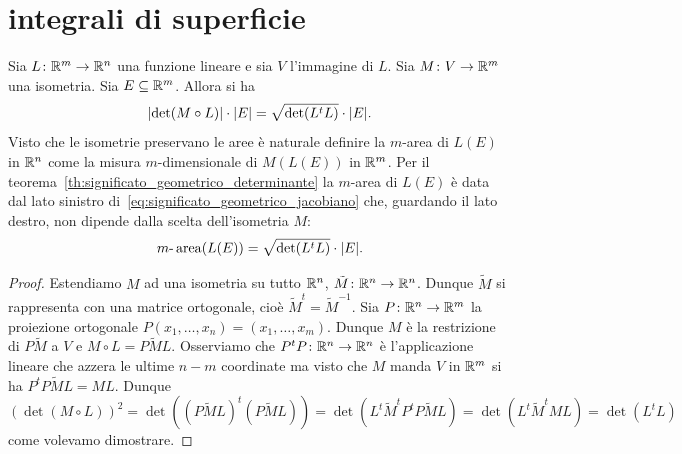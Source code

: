 \section{integrali di superficie}

\begin{theorem}
  \label{th:significato_geometrico_jacobiano}
  Sia $L\colon {\mathbb R}^m \to {\mathbb R}^n$ una funzione lineare
  e sia $V$ l'immagine di $L$.
  Sia $M\colon V \to {\mathbb R}^m$ una isometria.
  Sia $E\subseteq {\mathbb R}^m$.
  Allora si ha 
  \begin{equation}\label{eq:significato_geometrico_jacobiano}
    {\left|\det (M\circ L)\right|}\cdot {\left|E\right|} = \sqrt{\det (L^t L)}\cdot {\left|E\right|}.
  \end{equation}
  Visto che le isometrie preservano le aree
  è naturale definire la $m$-area di $L(E)$ in ${\mathbb R}^n$ 
  come la misura $m$-dimensionale di $M(L(E))$ in ${\mathbb R}^m$.
  Per il teorema~\ref{th:significato_geometrico_determinante}
  la $m$-area di $L(E)$ è data dal lato sinistro di~\eqref{eq:significato_geometrico_jacobiano}
  che, guardando il lato destro, non dipende dalla scelta dell'isometria $M$:
  \[
    m\text{-}\operatorname{area}(L(E)) = \sqrt{\det (L^t L)}\cdot {\left|E\right|}.
  \]
\end{theorem}
%
\begin{proof}
Estendiamo $M$ ad una isometria su tutto ${\mathbb R}^n$, $\tilde M\colon {\mathbb R}^n \to {\mathbb R}^n$.
Dunque $\tilde M$ si rappresenta con una matrice ortogonale, cioè $\tilde M^t = \tilde M^{-1}$.
Sia $P\colon {\mathbb R}^n \to {\mathbb R}^m$ la proiezione ortogonale $P(x_1,\dots,x_n) = (x_1,\dots,x_m)$.
Dunque $M$ è la restrizione di $P\tilde M$ a $V$
e $M\circ L = P\tilde M L$.
Osserviamo che $P^t P\colon {\mathbb R}^n\to {\mathbb R}^n$ è l'applicazione 
lineare che azzera le ultime $n-m$ coordinate
ma visto che $M$ manda $V$ in ${\mathbb R}^m$ si ha $P^t P \tilde ML = ML$. 
Dunque 
\[
 (\det(M\circ L))^2 
 = \det((P \tilde M L)^t (P \tilde M L)) 
 = \det(L^t \tilde M^t P^t P \tilde M L) 
 = \det(L^t \tilde M^t M L) = \det(L^t L)
\]
come volevamo dimostrare.
\end{proof}

